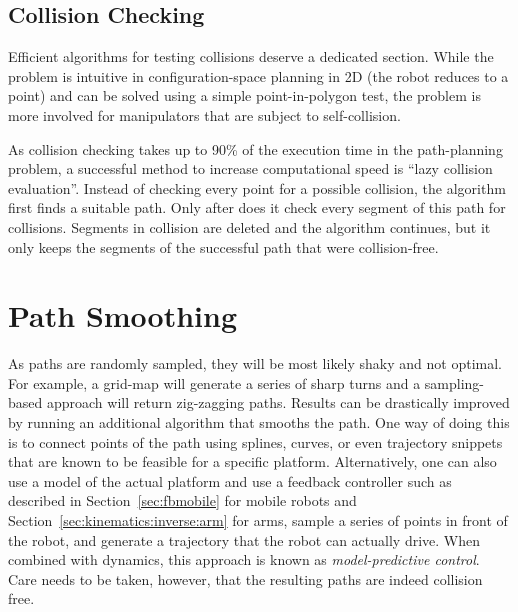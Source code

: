 \subsection{Collision Checking}
Efficient algorithms for testing collisions deserve a dedicated section. While the problem is intuitive in configuration-space planning in 2D (the robot reduces to a point) and can be solved using a simple point-in-polygon test, the problem is more involved for manipulators that are subject to self-collision.

As collision checking takes up to 90\% of the execution time in the path-planning problem, a successful method to increase computational speed is ``lazy collision evaluation''. Instead of checking every point for a possible collision, the algorithm first finds a suitable path. Only after does it check every segment of this path for collisions. Segments in collision are deleted and the algorithm continues, but it only keeps the segments of the successful path that were collision-free.

\section{Path Smoothing}
As paths are randomly sampled, they will be most likely shaky and not optimal. For example, a grid-map will generate a series of sharp turns and a sampling-based approach will return zig-zagging paths. Results can be drastically improved by running an additional algorithm that smooths the path. One way of doing this is to connect points of the path using splines, curves, or even trajectory snippets that are known to be feasible for a specific platform. Alternatively, one can also use a model of the actual platform and use a feedback controller such as described in Section~\ref{sec:fbmobile} for mobile robots and Section~\ref{sec:kinematics:inverse:arm} for arms, sample a series of points in front of the robot, and generate a trajectory that the robot can actually drive. When combined with dynamics, this approach is known as \textsl{model-predictive control}. Care needs to be taken, however, that the resulting paths are indeed collision free.

